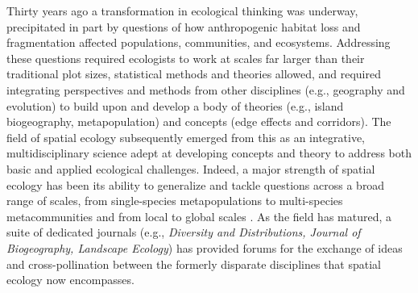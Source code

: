\documentclass[11pt,a4paper,oneside]{article}
\begin{document}

\newpage
\linenumbers

Thirty years ago a transformation in ecological thinking was underway, precipitated in part by questions of how anthropogenic habitat loss and fragmentation affected populations, communities, and ecosystems. Addressing these questions required ecologists to work at scales far larger than their traditional plot sizes, statistical methods and theories allowed, and required integrating perspectives and methods from other disciplines (e.g., geography and evolution) to build upon and develop a body of theories (e.g., island biogeography, metapopulation) and concepts (edge effects and corridors). The field of spatial ecology subsequently emerged from this as an integrative, multidisciplinary science adept at developing concepts and theory to address both basic and applied ecological challenges. Indeed, a major strength of spatial ecology has been its ability to generalize and tackle questions across a broad range of scales, from single-species metapopulations to multi-species metacommunities \citep{Pillai2011} and from local to global scales \citep{bell2001}. As the field has matured, a suite of dedicated journals  (e.g., \emph{Diversity and Distributions, Journal of Biogeography, Landscape Ecology}) has provided forums for the exchange of ideas and cross-pollination between the formerly disparate disciplines that spatial ecology now encompasses. 
\end{document}
